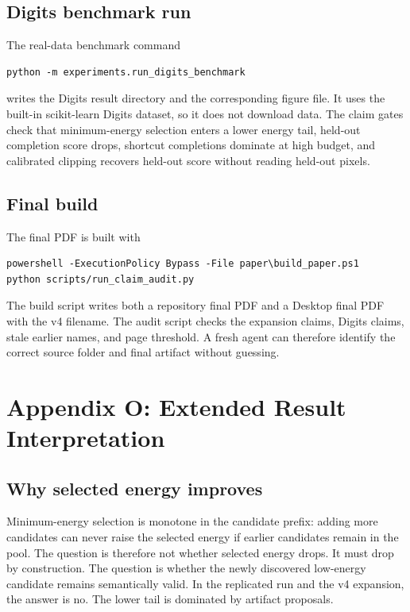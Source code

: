 \documentclass{article}
\begin{document}
\subsection{Digits benchmark run}

The real-data benchmark command
\begin{verbatim}
python -m experiments.run_digits_benchmark
\end{verbatim}
writes the Digits result directory and the corresponding figure file. It uses
the built-in scikit-learn Digits dataset, so it does not download data. The
claim gates check that minimum-energy selection enters a lower energy tail,
held-out completion score drops, shortcut completions dominate at high budget,
and calibrated clipping recovers held-out score without reading held-out
pixels.

\subsection{Final build}

The final PDF is built with
\begin{verbatim}
powershell -ExecutionPolicy Bypass -File paper\build_paper.ps1
python scripts/run_claim_audit.py
\end{verbatim}
The build script writes both a repository final PDF and a Desktop final PDF
with the v4 filename. The audit script checks the expansion claims, Digits
claims, stale earlier names, and page threshold. A fresh agent can therefore
identify the correct source folder and final artifact without guessing.

\section{Appendix O: Extended Result Interpretation}

\subsection{Why selected energy improves}

Minimum-energy selection is monotone in the candidate prefix: adding more
candidates can never raise the selected energy if earlier candidates remain in
the pool. The question is therefore not whether selected energy drops. It must
drop by construction. The question is whether the newly discovered low-energy
candidate remains semantically valid. In the replicated run and the v4
expansion, the answer is no. The lower tail is dominated by artifact proposals.
\end{document}
